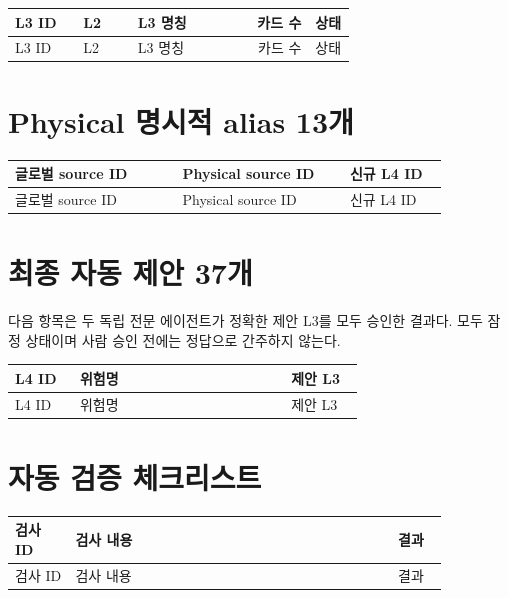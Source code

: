 \documentclass[11pt,a4paper]{article}
\begin{document}
\begin{landscape}
\small
\begin{longtable}{L{0.20\linewidth}L{0.16\linewidth}L{0.35\linewidth}rL{0.12\linewidth}}
\toprule
L3 ID & L2 & L3 명칭 & 카드 수 & 상태 \\
\midrule
\endfirsthead
\toprule
L3 ID & L2 & L3 명칭 & 카드 수 & 상태 \\
\midrule
\endhead

\end{longtable}
\end{landscape}

\section{Physical 명시적 alias 13개}

\begin{longtable}{L{0.34\linewidth}L{0.34\linewidth}L{0.20\linewidth}}
\toprule
글로벌 source ID & Physical source ID & 신규 L4 ID \\
\midrule
\endfirsthead
\toprule
글로벌 source ID & Physical source ID & 신규 L4 ID \\
\midrule
\endhead

\end{longtable}

\section{최종 자동 제안 37개}

다음 항목은 두 독립 전문 에이전트가 정확한 제안 L3를 모두 승인한 결과다. 모두 잠정 상태이며 사람 승인 전에는 정답으로 간주하지 않는다.

\begin{longtable}{L{0.16\linewidth}L{0.52\linewidth}L{0.18\linewidth}}
\toprule
L4 ID & 위험명 & 제안 L3 \\
\midrule
\endfirsthead
\toprule
L4 ID & 위험명 & 제안 L3 \\
\midrule
\endhead

\end{longtable}

\section{자동 검증 체크리스트}

\small
\begin{longtable}{L{0.12\linewidth}L{0.64\linewidth}L{0.10\linewidth}}
\toprule
검사 ID & 검사 내용 & 결과 \\
\midrule
\endfirsthead
\toprule
검사 ID & 검사 내용 & 결과 \\
\midrule
\endhead

\end{longtable}
\normalsize
\end{document}

